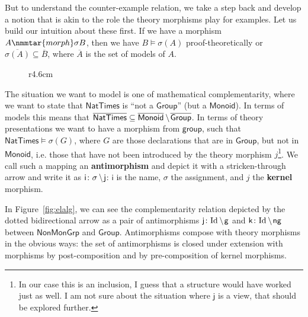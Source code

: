 \documentclass[11pt]{bluenote}
\def\modelsof#1{\overline{#1}}
\def\setdiff#1#2{#1\kern.2em\backslash\kern.1em #2}
\def\cn#1{\mathsf{#1}}
\def\defemph{\textbf}
\def\id{\text{Id}}
\begin{document}
But to understand the counter-example relation, we take a step back and develop a notion
that is akin to the role the theory morphisms play for examples. Let us build our
intuition about these first. If we have a morphism $A\nmmtar{morph}\sigma B$, then we
have $B\models\sigma(A)$ proof-theoretically or
$\modelsof{\sigma(A)}\subseteq\modelsof{B}$, where $\modelsof{A}$ is the set of models of
$A$.


\begin{wrapfigure}r{4.6cm}\vspace*{-1em}
\end{wrapfigure}
The situation we want to model is one of mathematical complementarity, where we want to
state that $\cn{NatTimes}$ is ``not a $\cn{Group}$'' (but a $\cn{Monoid}$). In terms of
models this means that $\modelsof{\cn{NatTimes}}\subseteq
\setdiff{\modelsof{\cn{Monoid}}}{\modelsof{\cn{Group}}}$.  In terms of theory
presentations we want to have a morphism from $\cn{group}$, such that
$\cn{NatTimes}\models\sigma(G)$, where $G$ are those declarations that are in
$\cn{Group}$, but not in $\cn{Monoid}$, i.e. those that have not been introduced by the
theory morphism $j$\footnote{In our case this is an inclusion, I guess that a structure
  would have worked just as well. I am not sure about the situation where $\cn{j}$ is a
  view, that should be explored further.}. We call such a mapping an
\defemph{antimorphism} and depict it with a stricken-through arrow and write it as
$\cn{i}\colon\setdiff\sigma{\cn{j}}$: $\cn{i}$ is the name, $\sigma$ the assignment, and
$j$ the \defemph{kernel} morphism.

In Figure~\ref{fig:elalg}, we can see the complementarity relation depicted by the dotted
bidirectional arrow as a pair of antimorphisms $\cn{j}\colon\setdiff\id{\cn{g}}$ and
$\cn{k}\colon\setdiff\id{\cn{ng}}$ between $\cn{NonMonGrp}$ and $\cn{Group}$. Antimorphisms
compose with theory morphisms in the obvious ways: the set of antimorphisms is closed
under extension with morphisms by post-composition and by pre-composition of kernel
morphisms.
\end{document}
